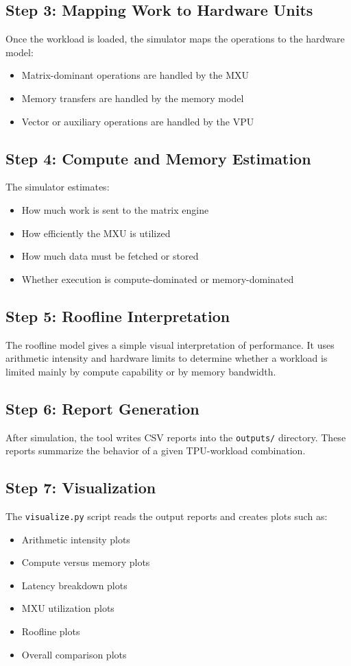\documentclass[12pt,a4paper]{article}
\begin{document}
	\subsection{Step 3: Mapping Work to Hardware Units}
	Once the workload is loaded, the simulator maps the operations to the hardware model:
	\begin{itemize}[itemsep=2pt, topsep=4pt]
		\item Matrix-dominant operations are handled by the MXU
		\item Memory transfers are handled by the memory model
		\item Vector or auxiliary operations are handled by the VPU
	\end{itemize}
	
	\subsection{Step 4: Compute and Memory Estimation}
	The simulator estimates:
	\begin{itemize}[itemsep=2pt, topsep=4pt]
		\item How much work is sent to the matrix engine
		\item How efficiently the MXU is utilized
		\item How much data must be fetched or stored
		\item Whether execution is compute-dominated or memory-dominated
	\end{itemize}
	
	\subsection{Step 5: Roofline Interpretation}
	The roofline model gives a simple visual interpretation of performance. It uses arithmetic intensity and hardware limits to determine whether a workload is limited mainly by compute capability or by memory bandwidth.
	
	\subsection{Step 6: Report Generation}
	After simulation, the tool writes CSV reports into the \texttt{outputs/} directory. These reports summarize the behavior of a given TPU-workload combination.
	
	\subsection{Step 7: Visualization}
	The \texttt{visualize.py} script reads the output reports and creates plots such as:
	\begin{itemize}[itemsep=2pt, topsep=4pt]
		\item Arithmetic intensity plots
		\item Compute versus memory plots
		\item Latency breakdown plots
		\item MXU utilization plots
		\item Roofline plots
		\item Overall comparison plots
	\end{itemize}
	
\end{document}
